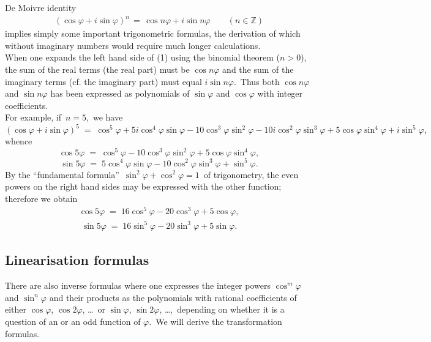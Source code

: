 \documentclass[12pt]{article}
\theoremstyle{definition}
\begin{document}
De Moivre identity
\begin{align}
(\cos\varphi+i\sin\varphi)^n \,=\, \cos{n\varphi}+i\sin{n\varphi} \qquad (n \in \mathbb{Z})
\end{align}
implies simply some important trigonometric formulas, the derivation of which without imaginary numbers would require much longer calculations.\\


When one expands the left hand side of (1) using the binomial theorem ($n > 0$), the sum of the real terms (the real part) must be $\cos{n\varphi}$ and the sum of the imaginary terms (cf. the imaginary part) must equal $i\sin{n\varphi}$.\, Thus both $\cos{n\varphi}$ and 
$\sin{n\varphi}$ has been expressed as polynomials of $\sin\varphi$ and $\cos\varphi$ with integer coefficients.\\

For example, if\, $n = 5$,\, we have
$$(\cos\varphi+i\sin\varphi)^5 \;=\;
\cos^5\varphi+5i\cos^4\varphi\sin\varphi-10\cos^3\varphi\sin^2\varphi
-10i\cos^2\varphi\sin^3\varphi+5\cos\varphi\sin^4\varphi+i\sin^5\varphi,$$
whence
$$\cos{5\varphi} \;=\; \cos^5\varphi-10\cos^3\varphi\sin^2\varphi+5\cos\varphi\sin^4\varphi,$$
$$\sin{5\varphi} \;=\; 5\cos^4\varphi\sin\varphi-10\cos^2\varphi\sin^3\varphi+\sin^5\varphi.$$
By the ``fundamental formula''\, $\sin^2\varphi+\cos^2\varphi = 1$\, of trigonometry, the even powers on the right hand sides may be expressed with the other function; therefore we obtain
\begin{align}
\cos{5\varphi} \;=\; 16\cos^5\varphi-20\cos^3\varphi+5\cos\varphi,
\end{align}
\begin{align}
\sin{5\varphi} \;=\; 16\sin^5\varphi-20\sin^3\varphi+5\sin\varphi.
\end{align}

\subsection{Linearisation formulas}
There are also inverse formulas where one expresses the integer powers $\cos^m\varphi$ and $\sin^n\varphi$ and their products as the polynomials with rational coefficients of either $\cos\varphi$, $\cos2\varphi$, \ldots\, or 
$\sin\varphi$, $\sin2\varphi$, \ldots,\, depending on whether it is a question of an  or an odd function of $\varphi$.\, We will derive the transformation formulas.
\end{document}
